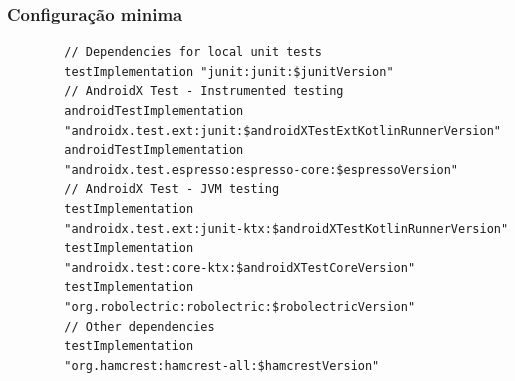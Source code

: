 \documentclass{beamer}
\begin{document}
\begin{frame} [fragile]
	\frametitle{Configuração minima}
	
	\begin{example}
		\begin{lstlisting}
		// Dependencies for local unit tests
		testImplementation "junit:junit:$junitVersion"
		// AndroidX Test - Instrumented testing
		androidTestImplementation 
		"androidx.test.ext:junit:$androidXTestExtKotlinRunnerVersion"
		androidTestImplementation 
		"androidx.test.espresso:espresso-core:$espressoVersion"
		// AndroidX Test - JVM testing
		testImplementation 
		"androidx.test.ext:junit-ktx:$androidXTestKotlinRunnerVersion"
		testImplementation 
		"androidx.test:core-ktx:$androidXTestCoreVersion"
		testImplementation 
		"org.robolectric:robolectric:$robolectricVersion"
		// Other dependencies
		testImplementation 
		"org.hamcrest:hamcrest-all:$hamcrestVersion"
		
		\end{lstlisting}
	\end{example}
	
\end{frame}
\end{document}
